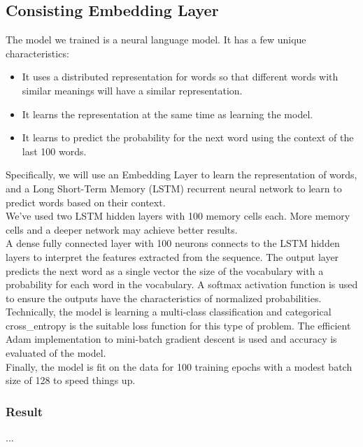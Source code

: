 \documentclass[conference]{IEEEtran}
\begin{document}

\subsection{Consisting Embedding Layer}

The model we trained is a neural language model. It has a few unique characteristics:

\begin{itemize}
\item It uses a distributed representation for words so that different words with similar meanings will have a similar representation.
\item It learns the representation at the same time as learning the model.
\item It learns to predict the probability for the next word using the context of the last 100 words.
\end{itemize}

Specifically, we will use an Embedding Layer to learn the representation of words, and a Long Short-Term Memory (LSTM) recurrent neural network to learn to predict words based on their context.\\
We’ve used two LSTM hidden layers with 100 memory cells each. More memory cells and a deeper network may achieve better results.\\
A dense fully connected layer with 100 neurons connects to the LSTM hidden layers to interpret the features extracted from the sequence. The output layer predicts the next word as a single vector the size of the vocabulary with a probability for each word in the vocabulary. A softmax activation function is used to ensure the outputs have the characteristics of normalized probabilities.\\
Technically, the model is learning a multi-class classification and categorical cross\_entropy is the suitable loss function for this type of problem. The efficient Adam implementation to mini-batch gradient descent is used and accuracy is evaluated of the model.\\
Finally, the model is fit on the data for 100 training epochs with a modest batch size of 128 to speed things up.

\subsubsection{Result}

...
\end{document}
